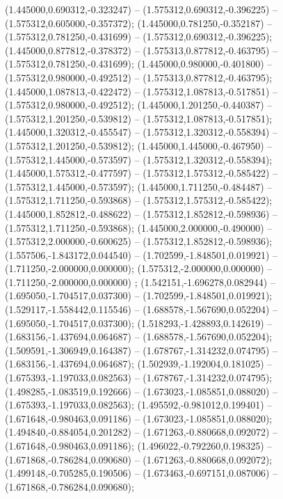  (1.445000,0.690312,-0.323247) -- (1.575312,0.690312,-0.396225) -- (1.575312,0.605000,-0.357372);
 (1.445000,0.781250,-0.352187) -- (1.575312,0.781250,-0.431699) -- (1.575312,0.690312,-0.396225);
 (1.445000,0.877812,-0.378372) -- (1.575313,0.877812,-0.463795) -- (1.575312,0.781250,-0.431699);
 (1.445000,0.980000,-0.401800) -- (1.575312,0.980000,-0.492512) -- (1.575313,0.877812,-0.463795);
 (1.445000,1.087813,-0.422472) -- (1.575312,1.087813,-0.517851) -- (1.575312,0.980000,-0.492512);
 (1.445000,1.201250,-0.440387) -- (1.575312,1.201250,-0.539812) -- (1.575312,1.087813,-0.517851);
 (1.445000,1.320312,-0.455547) -- (1.575312,1.320312,-0.558394) -- (1.575312,1.201250,-0.539812);
 (1.445000,1.445000,-0.467950) -- (1.575312,1.445000,-0.573597) -- (1.575312,1.320312,-0.558394);
 (1.445000,1.575312,-0.477597) -- (1.575312,1.575312,-0.585422) -- (1.575312,1.445000,-0.573597);
 (1.445000,1.711250,-0.484487) -- (1.575312,1.711250,-0.593868) -- (1.575312,1.575312,-0.585422);
 (1.445000,1.852812,-0.488622) -- (1.575312,1.852812,-0.598936) -- (1.575312,1.711250,-0.593868);
 (1.445000,2.000000,-0.490000) -- (1.575312,2.000000,-0.600625) -- (1.575312,1.852812,-0.598936);
 (1.557506,-1.843172,0.044540) -- (1.702599,-1.848501,0.019921) -- (1.711250,-2.000000,0.000000);
 (1.575312,-2.000000,0.000000) -- (1.711250,-2.000000,0.000000) ;
 (1.542151,-1.696278,0.082944) -- (1.695050,-1.704517,0.037300) -- (1.702599,-1.848501,0.019921);
 (1.529117,-1.558442,0.115546) -- (1.688578,-1.567690,0.052204) -- (1.695050,-1.704517,0.037300);
 (1.518293,-1.428893,0.142619) -- (1.683156,-1.437694,0.064687) -- (1.688578,-1.567690,0.052204);
 (1.509591,-1.306949,0.164387) -- (1.678767,-1.314232,0.074795) -- (1.683156,-1.437694,0.064687);
 (1.502939,-1.192004,0.181025) -- (1.675393,-1.197033,0.082563) -- (1.678767,-1.314232,0.074795);
 (1.498285,-1.083519,0.192666) -- (1.673023,-1.085851,0.088020) -- (1.675393,-1.197033,0.082563);
 (1.495592,-0.981012,0.199401) -- (1.671648,-0.980463,0.091186) -- (1.673023,-1.085851,0.088020);
 (1.494840,-0.884054,0.201282) -- (1.671263,-0.880668,0.092072) -- (1.671648,-0.980463,0.091186);
 (1.496022,-0.792260,0.198325) -- (1.671868,-0.786284,0.090680) -- (1.671263,-0.880668,0.092072);
 (1.499148,-0.705285,0.190506) -- (1.673463,-0.697151,0.087006) -- (1.671868,-0.786284,0.090680);
